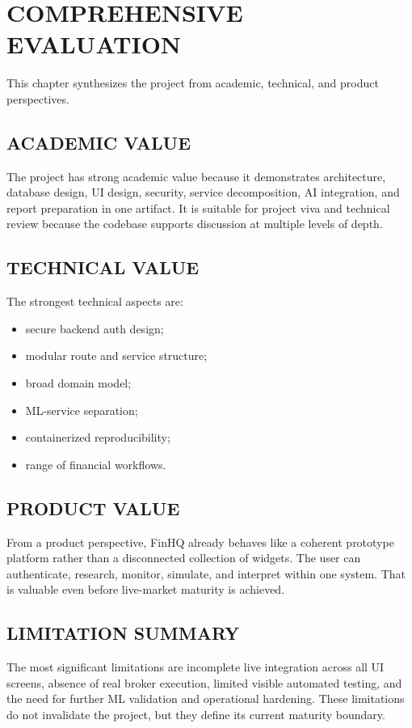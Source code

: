 \documentclass[12pt,a4paper]{report}
\newcommand{\projectshort}{FinHQ}
\begin{document}
\chapter{COMPREHENSIVE EVALUATION}
This chapter synthesizes the project from academic, technical, and product perspectives.

\section{ACADEMIC VALUE}
The project has strong academic value because it demonstrates architecture, database design, UI design, security, service decomposition, AI integration, and report preparation in one artifact. It is suitable for project viva and technical review because the codebase supports discussion at multiple levels of depth.

\section{TECHNICAL VALUE}
The strongest technical aspects are:
\begin{itemize}
\item secure backend auth design;
\item modular route and service structure;
\item broad domain model;
\item ML-service separation;
\item containerized reproducibility;
\item range of financial workflows.
\end{itemize}

\section{PRODUCT VALUE}
From a product perspective, \projectshort{} already behaves like a coherent prototype platform rather than a disconnected collection of widgets. The user can authenticate, research, monitor, simulate, and interpret within one system. That is valuable even before live-market maturity is achieved.

\section{LIMITATION SUMMARY}
The most significant limitations are incomplete live integration across all UI screens, absence of real broker execution, limited visible automated testing, and the need for further ML validation and operational hardening. These limitations do not invalidate the project, but they define its current maturity boundary.
\end{document}
